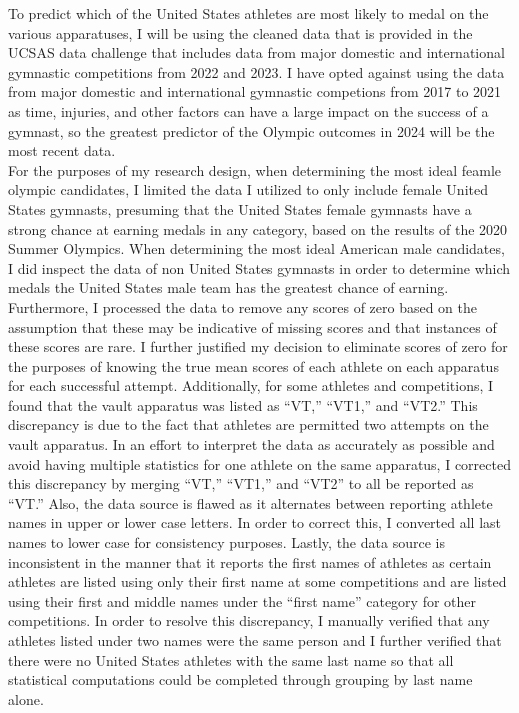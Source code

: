\documentclass[12pt]{article}
\begin{document}
To predict which of the United States athletes are most likely to medal on the various apparatuses, 
I will be using the cleaned data that 
is provided in the UCSAS data challenge that includes data from major domestic and international 
gymnastic competitions from 2022 and 2023. I have opted against using the data from major domestic
and international gymnastic competions from 2017 to 2021 as time, injuries, 
and other factors can have a large impact on the success of a gymnast, so the greatest predictor
of the Olympic outcomes in 2024 will be the most recent data.
\\
For the purposes of my research design, when determining the most ideal feamle olympic candidates, 
I limited the data I utilized to only include female United States
gymnasts, presuming that the United States female gymnasts have a strong chance at earning medals in any category, 
based on the results of the 2020 Summer Olympics. When determining the most ideal American male candidates, 
I did inspect the data of non United States gymnasts in order to determine which medals the United States 
male team has the greatest chance of earning. 
Furthermore, I processed the data to remove any scores of zero based on the assumption that these may 
be indicative of missing scores and that instances of these scores are rare. I further justified my decision 
to eliminate scores of zero for the purposes of knowing the true mean scores of each athlete on each 
apparatus for each successful attempt. Additionally, for some athletes and competitions, I found that the vault
apparatus was listed as ``VT,'' ``VT1,'' and ``VT2.'' This discrepancy is due to the fact that athletes are permitted
two attempts on the vault apparatus. In an effort to interpret the data as accurately as possible and avoid having 
multiple statistics for one athlete on the same apparatus, I corrected this discrepancy by merging ``VT,'' ``VT1,'' and 
``VT2'' to all be reported as ``VT.'' Also, the data source is flawed as it alternates between reporting athlete names
in upper or lower case letters. In order to correct this, I converted all last names to lower case for consistency 
purposes. Lastly, the data source is inconsistent in the manner that it reports the first names of athletes as certain
athletes are listed using only their first name at some competitions and are listed using their first and middle names 
under the ``first name'' category for other competitions. In order to resolve this discrepancy, I manually verified that 
any athletes listed under two names were the same person and I further verified that there were no United States  
athletes with the same last name so that all statistical computations could be completed through grouping by last 
name alone.
\end{document}
